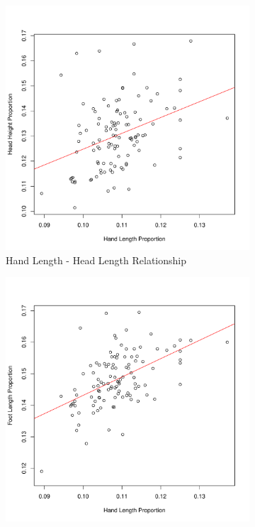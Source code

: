 \documentclass[]{article}
\begin{document}
\begin{figure}[!ht]
    \begin{subfigure}[h]{0.5\textwidth}
    \centering
            \includegraphics[clip,scale=0.5]{figures/hand-length-head-height-plot.pdf}
        \caption{ Hand Length - Head Length Relationship}
        \label{fig:hand-head-plot}
    \end{subfigure}
    \begin{subfigure}[h]{0.5\textwidth}
    \centering
        \includegraphics[clip,scale=0.5]{figures/hand-length-foot-length.pdf}

\end{subfigure}
\end{figure}
\end{document}
